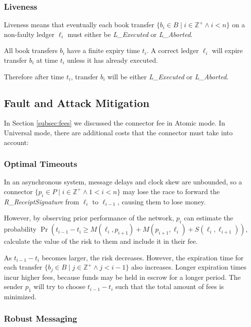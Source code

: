 \documentclass[letterpaper,twocolumn,10pt]{article}
\begin{document}
\subsubsection{Liveness}

Liveness means that eventually each book transfer $ \{ b_i \in B \mid i \in \mathbb{Z}^+ \land i < n \} $ on a non-faulty ledger $\ell_i$ must either be \textit{L\_Executed} or \textit{L\_Aborted}.

All book transfers $b_i$ have a finite expiry time $t_i$. A correct ledger $\ell_i$ will expire transfer $b_i$ at time $t_i$ unless it has already executed.

Therefore after time $t_i$, transfer $b_i$ will be either \textit{L\_Executed} or \textit{L\_Aborted}.

\subsection{Fault and Attack Mitigation}

In Section \ref{subsec:fees} we discussed the connector fee in Atomic mode. In Universal mode, there are additional costs that the connector must take into account:

\subsubsection{Optimal Timeouts}
\label{subsubsec:optimal-timeouts}

In an asynchronous system, message delays and clock skew are unbounded, so a connector $ \{ p_i \in P \mid i \in \mathbb{Z}^+ \land 1 < i < n \} $ may lose the race to forward the \textit{R\_ReceiptSignature} from $\ell_i$ to $\ell_{i-1}$, causing them to lose money.

However, by observing prior performance of the network, $p_i$ can estimate the probability $\Pr(t_{i-1} - t_i \geq M(\ell_i, p_{i+1}) + M(p_{i+1}, \ell_i) + S(\ell_i, \ell_{i+1}))$, calculate the value of the risk to them and include it in their fee.

As $t_{i-1} - t_i$ becomes larger, the risk decreases. However, the expiration time for each transfer $ \{ b_j \in B \mid j \in \mathbb{Z}^+ \land j < i-1 \} $ also increases. Longer expiration times incur higher fees, because funds may be held in escrow for a longer period. The sender $p_1$ will try to choose $t_{i-1} - t_i$ such that the total amount of fees is minimized.

\subsubsection{Robust Messaging}
\end{document}
